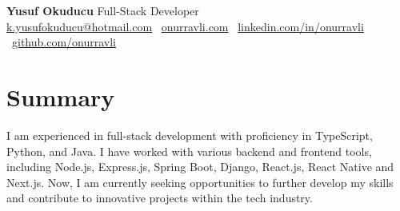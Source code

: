 \documentclass[10pt,a4paper]{extarticle}
\begin{document}
\begin{center}
    \begin{minipage}{\textwidth}
        \centering
        {\LARGE\textbf{Yusuf Okuducu}} \hspace{2pt} {\LARGE{Full-Stack Developer}}\\[10pt]
        \href{mailto:k.yusufokuducu@hotmail.com}{k.yusufokuducu@hotmail.com} \textbullet\
        \href{https://onurravli.com}{onurravli.com} \textbullet\
        \href{https://linkedin.com/in/onurravli}{linkedin.com/in/onurravli} \textbullet\
        \href{https://github.com/onurravli}{github.com/onurravli}
    \end{minipage}
\end{center}
\section{Summary}
I am experienced in full-stack development with proficiency in TypeScript, Python, and Java. I have worked
with various backend and frontend tools, including Node.js, Express.js, Spring Boot, Django, React.js, React
Native and Next.js. Now, I am currently seeking opportunities to further develop my skills and contribute to
innovative projects within the tech industry.
\end{document}
